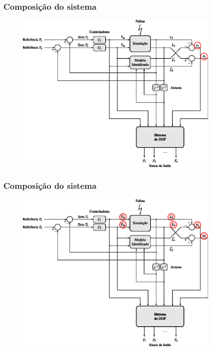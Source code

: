 \documentclass{beamer}
\begin{document}
\begin{frame}
    \frametitle{Composição do sistema}

\begin{figure}[htb]
\centering
    \includegraphics[width=0.9\textwidth]{imgs/sistema/eps/composicao_mod_6}
\end{figure}
\end{frame}

\begin{frame}
    \frametitle{Composição do sistema}

\begin{figure}[htb]
\centering
    \includegraphics[width=0.9\textwidth]{imgs/sistema/eps/composicao_mod_7}
\end{figure}
\end{frame}
\end{document}
